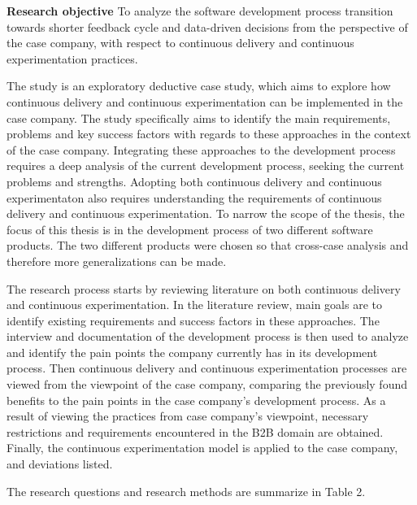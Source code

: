 \documentclass[english]{tktltiki2}
\theoremstyle{definition}
\theoremstyle{remark}
\begin{document}
\bigskip
\noindent \textbf{Research objective}
To analyze the software development process transition towards shorter feedback cycle and data-driven decisions from the perspective of the case company, with respect to continuous delivery and continuous experimentation practices.

The study is an exploratory deductive case study, which aims to explore how continuous delivery and continuous experimentation can be implemented in the case company. The study specifically aims to identify the main requirements, problems and key success factors with regards to these approaches in the context of the case company. Integrating these approaches to the development process requires a deep analysis of the current development process, seeking the current problems and strengths. Adopting both continuous delivery and continuous experimentaton also requires understanding the requirements of continuous delivery and continuous experimentation. To narrow the scope of the thesis, the focus of this thesis is in the development process of two different software products. The two different products were chosen so that cross-case analysis and therefore more generalizations can be made.

The research process starts by reviewing literature on both continuous delivery and continuous experimentation. In the literature review, main goals are to identify existing requirements and success factors in these approaches. The interview and documentation of the development process is then used to analyze and identify the pain points the company currently has in its development process. Then continuous delivery and continuous experimentation processes are viewed from the viewpoint of the case company, comparing the previously found benefits to the pain points in the case company's development process. As a result of viewing the practices from case company's viewpoint, necessary restrictions and requirements encountered in the B2B domain are obtained. Finally, the continuous experimentation model \cite{fagerholm2014building} is applied to the case company, and deviations listed. 

The research questions and research methods are summarize in Table 2.
\end{document}
